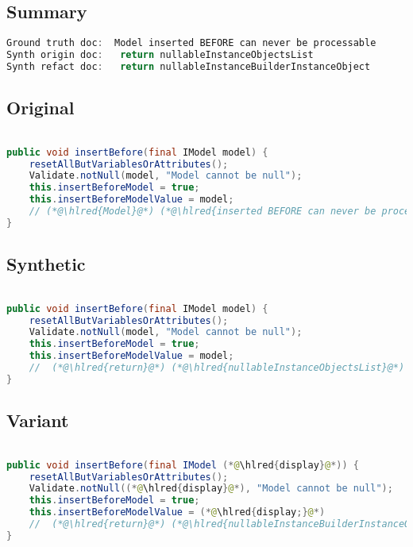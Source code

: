 \documentclass[11pt]{article}
\DeclareRobustCommand{\hlred}[1]{{\sethlcolor{YellowOrange}\hl{#1}}}
\begin{document}
  \subsection{Summary}

  \begin{lstlisting}[language=java]
Ground truth doc:  Model inserted BEFORE can never be processable
Synth origin doc:   return nullableInstanceObjectsList
Synth refact doc:   return nullableInstanceBuilderInstanceObject
  \end{lstlisting}

  \subsection{Original}
  \begin{lstlisting}[language=java]

public void insertBefore(final IModel model) {
    resetAllButVariablesOrAttributes();
    Validate.notNull(model, "Model cannot be null");
    this.insertBeforeModel = true;
    this.insertBeforeModelValue = model;
    // (*@\hlred{Model}@*) (*@\hlred{inserted BEFORE can never be processable}@*)
}
  \end{lstlisting}
  \subsection{Synthetic}

  \begin{lstlisting}[language=java]

public void insertBefore(final IModel model) {
    resetAllButVariablesOrAttributes();
    Validate.notNull(model, "Model cannot be null");
    this.insertBeforeModel = true;
    this.insertBeforeModelValue = model;
    //  (*@\hlred{return}@*) (*@\hlred{nullableInstanceObjectsList}@*)
}
  \end{lstlisting}

  \subsection{Variant}

  \begin{lstlisting}[language=java]

public void insertBefore(final IModel (*@\hlred{display}@*)) {
    resetAllButVariablesOrAttributes();
    Validate.notNull((*@\hlred{display}@*), "Model cannot be null");
    this.insertBeforeModel = true;
    this.insertBeforeModelValue = (*@\hlred{display;}@*)
    //  (*@\hlred{return}@*) (*@\hlred{nullableInstanceBuilderInstanceObject}@*)
}
  \end{lstlisting}
\end{document}
